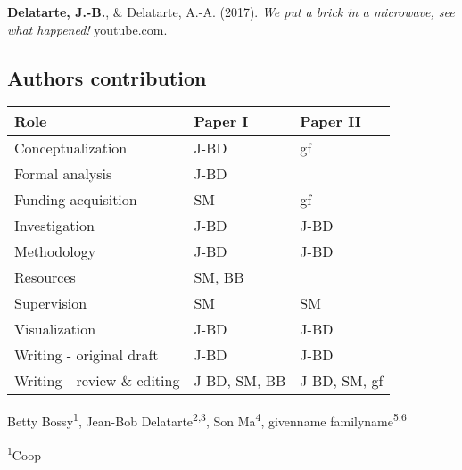 \documentclass[
  letterpaper,
  DIV=11,
  numbers=noendperiod]{scrartcl}
\newlength{\cslhangindent}
\newenvironment{CSLReferences}[2] %
 {\begin{list}{}{%
  \setlength{\itemindent}{0pt}
  \setlength{\leftmargin}{0pt}
  \setlength{\parsep}{0pt}
  \ifodd #1
   \setlength{\leftmargin}{\cslhangindent}
   \setlength{\itemindent}{-1\cslhangindent}
  \fi
  \setlength{\itemsep}{#2\baselineskip}}}
 {\end{list}}
\begin{document}
\label{refs-other}
\begin{CSLReferences}{1}{0}
\textbf{Delatarte, J.-B.}, \& Delatarte, A.-A. (2017). \emph{We put a
brick in a microwave, see what happened!} youtube.com.

\end{CSLReferences}

\subsection{Authors contribution}\label{authors-contribution}

\begin{longtable}[]{@{}
  >{\raggedright\arraybackslash}p{}
  >{\raggedright\arraybackslash}p{}
  >{\raggedright\arraybackslash}p{}@{}}
\toprule\noalign{}
\begin{minipage}[b]{\linewidth}\raggedright
Role
\end{minipage} & \begin{minipage}[b]{\linewidth}\raggedright
Paper I
\end{minipage} & \begin{minipage}[b]{\linewidth}\raggedright
Paper II
\end{minipage} \\
\midrule\noalign{}
\endhead
\bottomrule\noalign{}
\endlastfoot
Conceptualization & J-BD & gf \\
Formal analysis & J-BD & \\
Funding acquisition & SM & gf \\
Investigation & J-BD & J-BD \\
Methodology & J-BD & J-BD \\
Resources & SM, BB & \\
Supervision & SM & SM \\
Visualization & J-BD & J-BD \\
Writing - original draft & J-BD & J-BD \\
Writing - review \& editing & J-BD, SM, BB & J-BD, SM, gf \\
\end{longtable}

Betty Bossy\textsuperscript{1}, Jean-Bob Delatarte\textsuperscript{2,3},
Son Ma\textsuperscript{4}, givenname familyname\textsuperscript{5,6}

\textsuperscript{1}Coop
\end{document}

